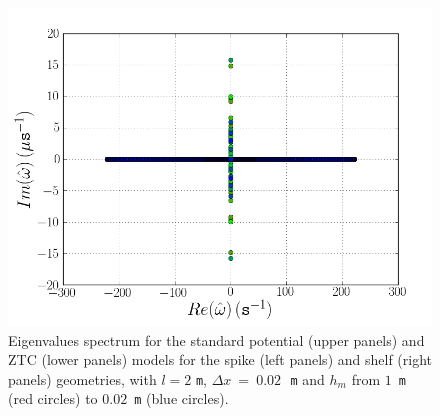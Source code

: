 \begin{figure}
\begin{center}
    \includegraphics[type=png,ext=.png,read=.png,width=\smallfig]{chapters/lopes/png/L_2_dx_0.02_hm_shelf_spectrum_Zhao}
  \end{center}
  \caption{Eigenvalues spectrum for the standard potential (upper
    panels) and ZTC (lower panels) models for the spike (left panels) and
    shelf (right panels) geometries, with $l=2$ {\tt m}, $\Delta
    x~=~0.02$\,~{\tt m} and $h_m$ from $1$~{\tt m} (red circles) to
    $0.02$~{\tt m} (blue circles).}
  \label{fig:lopes:spectrumhm1}
\end{figure}

